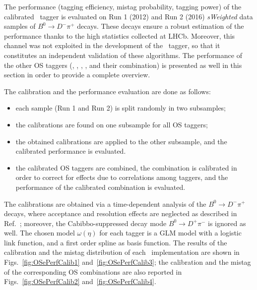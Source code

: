 The performance (tagging efficiency, mistag probability, tagging power) of the calibrated \OSe~tagger is evaluated on Run 1 (2012) and Run 2 (2016) \emph{sWeighted} data samples of $B^0\to D^-\pi^+$ decays.
These decays ensure a robust estimation of the performance thanks to the high statistics collected at LHCb. Moreover, this channel was not exploited in the development of
the \OSe~tagger, so that it constitutes an independent validation of these algorithms. The performance of the other OS taggers (\OSmu, \OSK, \OSc, \OSvtx, and their combination) is presented
as well in this section in order to provide a complete overview.

The calibration and the performance evaluation are done as follows:
\begin{itemize}[noitemsep,topsep=0pt]
  \item each sample (Run 1 and Run 2) is split randomly in two subsamples;
    \item the calibrations are found on one subsample for all OS taggers;
      \item the obtained calibrations are applied to the other subsample, and the calibrated performance is evaluated.
        \item the calibrated OS taggers are combined, the combination is calibrated in order to correct for effects due to correlations among taggers, and the performance of the calibrated combination is evaluated.
\end{itemize}

The calibrations are obtained via a time-dependent analysis of the $B^0\to D^-\pi^+$ decays, where acceptance and resolution effects are neglected as described in Ref.~\cite{EPM}; moreover, the Cabibbo-suppressed decay mode $B^0\to D^+\pi^-$ is ignored as well.
The chosen model 
$\omega(\eta)$ for each tagger is a GLM model with a logistic link function, and a first order spline as basis function. The results of the calibration and the mistag distribution of each \OSe~implementation are shown in Figs.~\ref{fig:OSePerfCalib1} and~\ref{fig:OSePerfCalib3}; the calibration and the mistag of the corresponding OS combinations are also reported in Figs.~\ref{fig:OSePerfCalib2} and~\ref{fig:OSePerfCalib4}.
 
